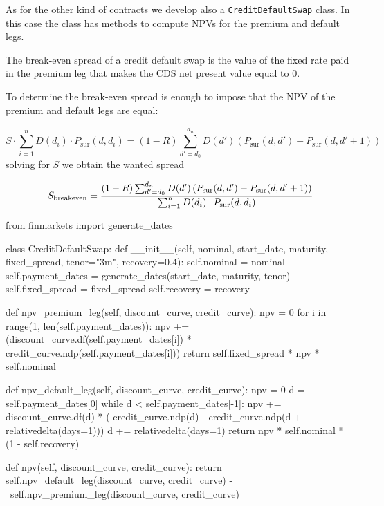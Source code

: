 \begin{finmarkets}
As for the other kind of contracts we develop also a \texttt{CreditDefaultSwap} class. In this case the class has methods to compute NPVs for the premium and default legs. 

The break-even spread of a credit default swap is the value of the fixed rate paid in the premium leg that makes the CDS net present value equal to 0.

To determine the break-even spread is enough to impose that the NPV of the premium and default legs are equal:

\begin{equation}
S \cdot\sum_{i=1}^{n} D(d_i) \cdot P_{\textrm{sur}}(d, d_i)
= (1-R) \sum_{d'=d_0}^{d_n} D(d') \left( P_{\textrm{sur}}(d, d') - P_{\textrm{sur}}(d, d'+1) \right)
\end{equation}
solving for $S$ we obtain the wanted spread

\begin{equation}
S_{\mathrm{breakeven}} = \cfrac{(1-R) \sum_{d'=d_0}^{d_n} D(d') \left( P_{\textrm{sur}}(d, d') - P_{\textrm{sur}}(d, d'+1) \right)}{\sum_{i=1}^{n} D(d_i) \cdot P_{\textrm{sur}}(d, d_i)}
\end{equation}
\end{finmarkets}

\begin{ipython}
from finmarkets import generate_dates

class CreditDefaultSwap:
    def __init__(self, nominal, start_date, maturity, fixed_spread,
                 tenor="3m", recovery=0.4):
        self.nominal = nominal
        self.payment_dates = generate_dates(start_date, maturity, tenor)
        self.fixed_spread = fixed_spread
        self.recovery = recovery

    def npv_premium_leg(self, discount_curve, credit_curve):
        npv = 0
        for i in range(1, len(self.payment_dates)):
            npv += (discount_curve.df(self.payment_dates[i]) *
                    credit_curve.ndp(self.payment_dates[i]))
        return self.fixed_spread * npv * self.nominal

    def npv_default_leg(self, discount_curve, credit_curve):
        npv = 0
        d = self.payment_dates[0]
        while d < self.payment_dates[-1]:
            npv += discount_curve.df(d) * (
                   credit_curve.ndp(d) -
                   credit_curve.ndp(d + relativedelta(days=1)))
            d += relativedelta(days=1)
        return npv * self.nominal * (1 - self.recovery)

    def npv(self, discount_curve, credit_curve):
        return self.npv_default_leg(discount_curve, credit_curve) - \
               self.npv_premium_leg(discount_curve, credit_curve)
\end{ipython}

